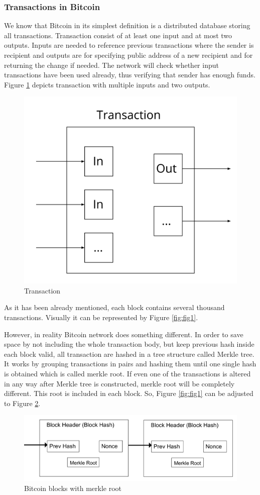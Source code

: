 \documentclass[conference,compsoc]{IEEEtran}
\begin{document}
\subsubsection{Transactions in Bitcoin}
We know that Bitcoin in its simplest definition is a distributed database storing all transactions. 
Transaction consist of at least one input and at most two outputs.
Inputs are needed to reference previous transactions where the sender is recipient and outputs are for specifying public address of a new recipient and for returning the change if needed.
The network will check whether input transactions have been used already, thus verifying that sender has enough funds.
Figure \ref{fig:fig5} depicts transaction with multiple inputs and two outputs.

\begin{figure}[h]
  \centering
  \includegraphics[width=.45\textwidth]{graphics/tx.png}
  \caption{Transaction}
  \label{fig:fig5}
\end{figure}

As it has been already mentioned, each block contains several thousand transactions. 
Visually it can be represented by Figure \ref{fig:fig1}. 

However, in reality Bitcoin network does something different. 
In order to save space by not including the whole transaction body, but keep previous hash inside each block valid, all transaction are hashed in a tree structure called Merkle tree.
It works by grouping transactions in pairs and hashing them until one single hash is obtained which is called merkle root. 
If even one of the transactions is altered in any way after Merkle tree is constructed, merkle root will be completely different. 
This root is included in each block.
So, Figure \ref{fig:fig1} can be adjusted to Figure \ref{fig:fig6}.

\begin{figure}[h]
  \centering
  \includegraphics[width=.45\textwidth]{graphics/blocks_merkle.png}
  \caption{Bitcoin blocks with merkle root}
  \label{fig:fig6}
\end{figure}
\end{document}
